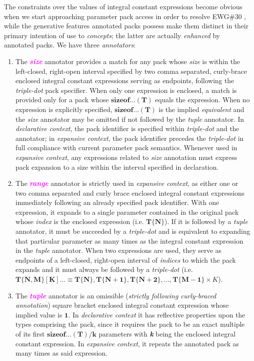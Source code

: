 \p The constraints over the values of integral constant expressions become obvious when we start approaching parameter pack access in order to resolve EWG\#30 \cite{Abrahams2012}, while the generative features annotated packs possess make them distinct in their primary intention of use to \textit{concepts}; the latter are actually \textit{enhanced} by annotated packs.
We have three \textit{annotators}:
\begin{enumerate}
\item\p The \textcolor{Magenta}{\textbf{\textit{size}}} annotator provides a match for any pack whose \textit{size} is within the left-closed, right-open interval specified by two comma separated, curly-brace enclosed integral constant expressions serving as endpoints, following the \textit{triple-dot} pack specifier.
When only one expression is enclosed, a match is provided only for a pack whose $\bm{sizeof...(T)}$ equals the expression.
When no expression is explicitly specified, $\bm{sizeof...(T)}$ is the implied \textit{equivalent} and the \textit{size} annotator may be omitted if not followed by the \textit{tuple} annotator.
In \textit{declarative context}, the pack identifier is specified within \textit{triple-dot} and the annotator; in \textit{expansive context}, the pack identifier precedes the \textit{triple-dot} in full compliance with current parameter pack semantics.
Whenever used in \textit{expansive context}, any expressions related to \textit{size} annotation must express pack expansion to a size within the interval specified in declaration.

\item\p The \textcolor{Magenta}{\textbf{\textit{range}}} annotator is strictly used in \textit{expansive context}, as either one or two comma separated and curly brace enclosed integral constant expressions immediately following an already specified pack identifier.
With one expression, it expands to a single parameter contained in the original pack whose \textit{index} is the enclosed expression (i.e. $\bm{T\{N\}}$). If it is followed by a \textit{tuple} annotator, it must be succeeded by a \textit{triple-dot} and is equivalent to expanding that particular parameter as many times as the integral constant expression in the \textit{tuple} annotator.
When two expressions are used, they serve as endpoints of a left-closed, right-open interval of \textit{indices} to which the pack expands and it must always be followed by a \textit{triple-dot} (i.e. $\bm{T\{N,M\}[K]... \equiv T\{N\},T\{N+1\},T\{N+2\},...,T\{M-1\}} \times K $).

\item\p The \textcolor{Magenta}{\textbf{\textit{tuple}}} annotator is an omissible (\textit{strictly following curly-braced annotation}) square bracket enclosed integral constant expression whose implied value is $\bm{1}$.
In \textit{declarative context} it has reflective properties upon the types comprising the pack, since it requires the pack to be an exact multiple of its first $\bm{sizeof...(T)/k}$ parameters  with \textbf{\textit{k}} being the enclosed integral constant expression.
In \textit{expansive context}, it repeats the annotated pack as many times as said expression.

\end{enumerate}
